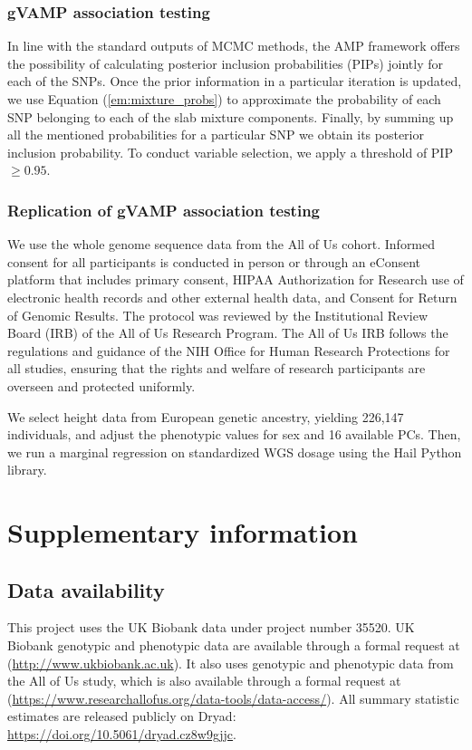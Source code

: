 \subsubsection{gVAMP association testing}
In line with the standard outputs of MCMC methods, the AMP framework offers the possibility of calculating posterior inclusion probabilities (PIPs) jointly for each of the SNPs. Once the prior information in a particular iteration is updated, we use Equation (\ref{em:mixture_probs}) to approximate the probability of each SNP belonging to each of the slab mixture components. Finally, by summing up all the mentioned probabilities for a particular SNP we obtain its posterior inclusion probability. To conduct variable selection, we apply a threshold of PIP $\ge 0.95$.

\subsubsection{Replication of gVAMP association testing}
We use the whole genome sequence data from the All of Us cohort\cite{allofus}. Informed consent for all participants is conducted in person or through an eConsent platform that includes primary consent, HIPAA Authorization for Research use of electronic health records and other external health data, and Consent for Return of Genomic Results. The protocol was reviewed by the Institutional Review Board (IRB) of the All of Us Research Program. The All of Us IRB follows the regulations and guidance of the NIH Office for Human Research Protections for all studies, ensuring that the rights and welfare of research participants are overseen and protected uniformly.

We select height data from European genetic ancestry, yielding 226,147 individuals, and adjust the phenotypic values for sex and 16 available PCs. Then, we run a marginal regression on standardized WGS dosage using the Hail Python library.

\section{Supplementary information}

\subsection{Data availability}
This project uses the UK Biobank data under project number 35520. UK Biobank genotypic and phenotypic data are available through a formal request at (\url{http://www.ukbiobank.ac.uk}). It also uses genotypic and phenotypic data from the All of Us study, which is also available through a formal request at (\url{https://www.researchallofus.org/data-tools/data-access/}). All summary statistic estimates are released publicly on Dryad: \url{https://doi.org/10.5061/dryad.cz8w9gjjc}.

